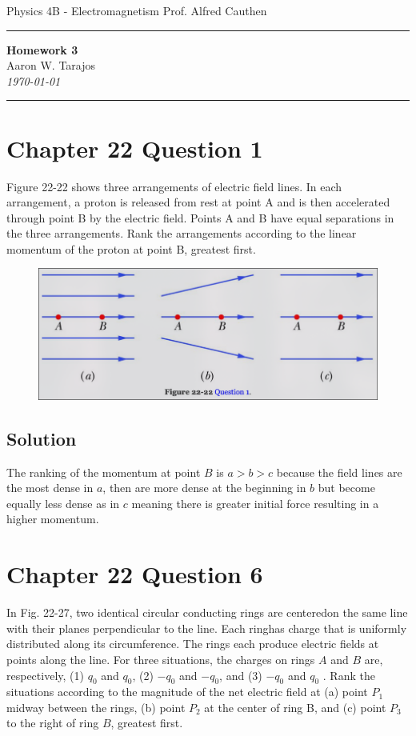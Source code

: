 \documentclass{article}
\begin{document}
\noindent
Physics 4B - Electromagnetism \hfill Prof. Alfred Cauthen
\noindent\rule{\textwidth}{0.4pt}

\begin{center}
    \textbf{\LARGE Homework 3} \\
    \vspace{12pt}
    \large Aaron W. Tarajos \\
    \textit{\today}
\end{center}

\noindent\rule{\textwidth}{0.4pt}

\section*{Chapter 22 Question 1}
Figure 22-22 shows three arrangements of electric field lines.
In each arrangement, a proton is released from rest at point A and is then accelerated through point B by the electric field. 
Points A and B have equal separations in the three arrangements. 
Rank the arrangements according to the linear momentum of the proton at point B, greatest first.

\begin{figure}[ht]
    \centering
    \includegraphics[scale=0.4]{image-1.png}
\end{figure}

\subsection*{Solution}
The ranking of the momentum at point $B$ is $a > b > c$ because the field lines are the most dense in $a$,  then are more dense at the beginning in $b$ but become equally less dense as in $c$ meaning there is greater initial force resulting in a higher momentum.

\section*{Chapter 22 Question 6}
In Fig. 22-27, two identical circular conducting rings are centeredon the same line with their planes perpendicular to the line. 
Each ringhas charge that is uniformly distributed along its circumference. 
The rings each produce electric fields at points along the line. 
For three situations, the charges on rings $A$ and $B$ are, respectively, (1) $q_0$ and $q_0$, (2) $-q_0$ and $-q_0$, and (3) $-q_0$ and $q_0$ . 
Rank the situations according to the magnitude of the net electric field at (a) point $P_1$ midway between the rings, (b) point $P_2$ at the center of ring B, and (c) point $P_3$ to the right of ring $B$, greatest first.
\end{document}
